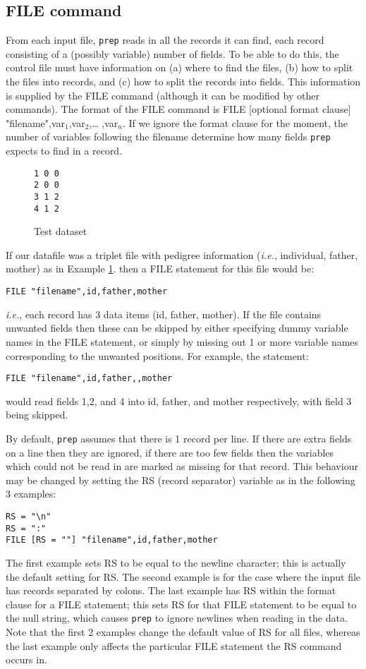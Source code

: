 \documentclass[10pt,a4paper]{article}
\newcommand{\IE}{\textit{i.e.},\xspace}
\newcommand{\Prep}{\texttt{prep}\xspace}
\begin{document}
\subsection{FILE command}
From each input file, \Prep reads in all the records it can find, each
record consisting of a (possibly variable) number of fields.  To be able
to do this, the control file must have information on (a) where to find the
files, (b) how to split the files into records, and (c) how to split the
records into fields.  This information is supplied by the FILE command
(although it can be modified by other commands).  The format of the FILE
command is FILE [optional format clause] "filename",var$_1$,var$_2$,\ldots
,var$_n$.  If we ignore the format clause for the moment, the number of
variables following the filename determine how many fields \Prep expects to
find in a record.
\begin{figure}[hb]
\caption{\label{fig:1}Test dataset}
\begin{verbatim}
1 0 0
2 0 0
3 1 2
4 1 2
\end{verbatim}
\end{figure}
If our datafile was a triplet file with pedigree information (\IE
individual, father, mother) as in Example \ref{fig:1}. then a FILE statement
for this file would be:
\begin{verbatim}
FILE "filename",id,father,mother
\end{verbatim}
\IE each record has 3 data items (id, father, mother).  If the file contains
unwanted fields then these can be skipped by either specifying dummy
variable names in the FILE statement, or simply by missing out 1 or more variable
names corresponding to the unwanted positions.  For example, the statement:
\begin{verbatim}
FILE "filename",id,father,,mother
\end{verbatim}
would read fields 1,2, and 4 into id, father, and mother respectively, with
field 3 being skipped.

By default, \Prep assumes that there is 1 record per line.  If there are
extra fields on a line then they are ignored, if there are too few fields
then the variables which could not be read in are marked as missing for that
record.  This behaviour may be changed by setting the RS (record separator)
variable as in the following 3 examples:
\begin{verbatim}
RS = "\n"
RS = ":"
FILE [RS = ""] "filename",id,father,mother
\end{verbatim}
The first example sets RS to be equal to the newline character; this is
actually the default setting for RS.  The second example is for the case
where the input file has records separated by colons.  The last example has
RS within the format clause for a FILE statement; this sets
RS for that FILE statement to be equal to the null string, which causes
\Prep to ignore newlines when reading in the data.  Note that the first 2
examples change the default value of RS for all files, whereas the last
example only affects the particular FILE statement the RS command occurs in.
\end{document}
